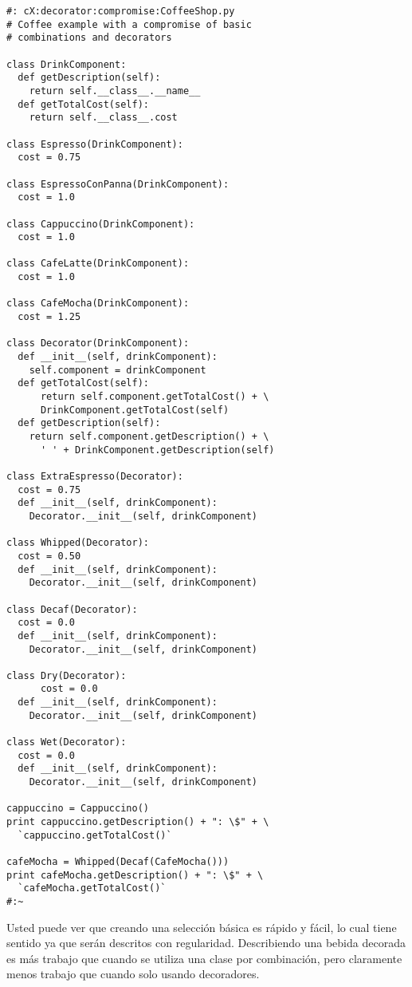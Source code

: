 \begin{lstlisting} 
#: cX:decorator:compromise:CoffeeShop.py 
# Coffee example with a compromise of basic 
# combinations and decorators 

class DrinkComponent: 
  def getDescription(self): 
    return self.__class__.__name__ 
  def getTotalCost(self): 
    return self.__class__.cost 
    
class Espresso(DrinkComponent): 
  cost = 0.75 
  
class EspressoConPanna(DrinkComponent): 
  cost = 1.0 
  
class Cappuccino(DrinkComponent): 
  cost = 1.0 
  
class CafeLatte(DrinkComponent): 
  cost = 1.0 
  
class CafeMocha(DrinkComponent): 
  cost = 1.25 
  
class Decorator(DrinkComponent): 
  def __init__(self, drinkComponent): 
    self.component = drinkComponent 
  def getTotalCost(self): 
      return self.component.getTotalCost() + \ 
      DrinkComponent.getTotalCost(self) 
  def getDescription(self): 
    return self.component.getDescription() + \ 
      ' ' + DrinkComponent.getDescription(self) 
      
class ExtraEspresso(Decorator): 
  cost = 0.75 
  def __init__(self, drinkComponent): 
    Decorator.__init__(self, drinkComponent) 
    
class Whipped(Decorator): 
  cost = 0.50 
  def __init__(self, drinkComponent): 
    Decorator.__init__(self, drinkComponent) 
    
class Decaf(Decorator): 
  cost = 0.0 
  def __init__(self, drinkComponent): 
    Decorator.__init__(self, drinkComponent) 
    
class Dry(Decorator): 
      cost = 0.0 
  def __init__(self, drinkComponent): 
    Decorator.__init__(self, drinkComponent) 
    
class Wet(Decorator): 
  cost = 0.0 
  def __init__(self, drinkComponent): 
    Decorator.__init__(self, drinkComponent) 
    
cappuccino = Cappuccino() 
print cappuccino.getDescription() + ": \$" + \ 
  `cappuccino.getTotalCost()` 
  
cafeMocha = Whipped(Decaf(CafeMocha())) 
print cafeMocha.getDescription() + ": \$" + \ 
  `cafeMocha.getTotalCost()` 
#:~ 
\end{lstlisting}

Usted puede ver que creando una selección básica es rápido y fácil, lo cual tiene sentido ya que serán descritos con regularidad. Describiendo una bebida decorada es más trabajo que cuando se utiliza una clase por combinación, pero claramente menos trabajo que cuando solo usando decoradores.    \newline

